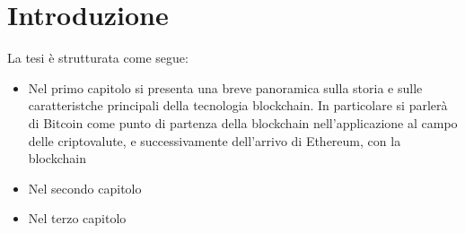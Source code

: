 \chapter*{Introduzione}                 %

La tesi è strutturata come segue:
\begin{itemize}
    \item Nel primo capitolo si presenta una breve panoramica sulla storia e sulle caratteristche principali della tecnologia blockchain. In particolare si parlerà di Bitcoin come punto di partenza della blockchain nell'applicazione al campo delle criptovalute, e successivamente dell'arrivo di Ethereum, con la blockchain 
    
    \item Nel secondo capitolo 
    
    \item Nel terzo capitolo 
    
\end{itemize}

\clearpage{\pagestyle{empty}\cleardoublepage}